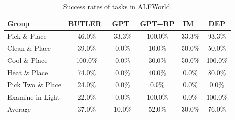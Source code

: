 \begin{table}[H]
\centering
\caption{Success rates of tasks in ALFWorld.}
\label{tab:alfworld_results}
\renewcommand\arraystretch{1.1}
\begin{tabular}{@{}lccccc@{}}
\toprule
Group & BUTLER~\cite{alfworld} & GPT~\cite{huang2022language} & GPT+RP & IM~\cite{innermonologue} & DEP \\ \midrule
Pick \& Place     & {46.0\%} & {33.3\%}   & {100.0\%}      & {33.3\%}   & {93.3\%} \\
Clean \& Place    & {39.0\%} & 0.0\%   & 10.0\%    & {50.0\%} & {50.0\%} \\
Cool \& Place     & {100.0\%} & 0.0\%   & {30.0\%}    & {50.0\%}   & {100.0\%}   \\
Heat \& Place     & {74.0\%} & 0.0\%   & {40.0\%}    & 0.0\% & {80.0\%} \\
Pick Two \& Place & {24.0\%} & 0.0\%   & 0.0\%    & 0.0\%   & 0.0\% \\
Examine in Light  & {22.0\%} & 0.0\%   & {100.0\%}      & 0.0\%   & {100.0\%}  \\ \midrule
Average           & {37.0\%} & 10.0\%  & {\color{blue}52.0\%}   & 30.0\%   & {\color{red}76.0\%} \\ \bottomrule

\end{tabular}
\end{table}

